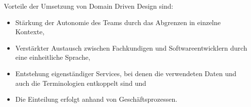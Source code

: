 Vorteile der Umsetzung von Domain Driven Design sind:
\begin{itemize}
	\item Stärkung der Autonomie des Teams durch das Abgrenzen in einzelne Kontexte,
	\item Verstärkter Austausch zwischen Fachkundigen und Softwareentwicklern durch eine einheitliche Sprache,
	\item Entstehung eigenständiger Services, bei denen die verwendeten Daten und auch die Terminologien entkoppelt sind und
	\item Die Einteilung erfolgt anhand von Geschäftsprozessen.
\end{itemize}
